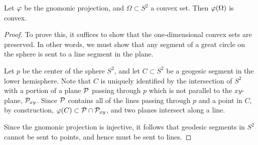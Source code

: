 \begin{lemma} \label{lem:gnomonic_convex}
  Let $\varphi$ be the gnomonic projection, and $\Omega\subset S^2$ a convex 
  set. Then $\varphi(\Omega)$ is convex.
\end{lemma}
\begin{proof}
  To prove this, it suffices to show that the one-dimensional convex
  sets are preserved. In other words, we must show that any segment of 
  a great circle on the sphere is sent to a line segment in the plane.

  Let $p$ be the center of the sphere $S^2$, and let $C\subset S^2$ be
  a geogesic segment in the lower hemisphere.  Note that $C$ is uniquely
  identified by the intersection of $S^2$ with a portion of a plane
  $\mathcal{P}$ passing through $p$ which is not parallel to the $xy$-plane,  
  $\mathcal{P}_{xy}$. Since $\mathcal{P}$ contains all of the lines passing
  through $p$ and a point in $C$, by construction, $\varphi(C)\subset
  \mathcal{P}\cap \mathcal{P}_{xy}$, and two planes intersect along a line. 

  Since the gnomonic projection is injective, it follows that 
  geodesic segments in $S^2$ cannot be sent to points, and hence 
  must be sent to lines. 
\end{proof}


